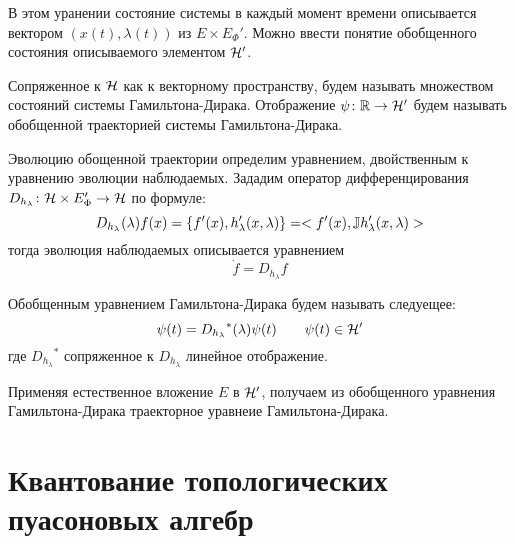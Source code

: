 \documentclass[10pt,a4paper]{article}
\begin{document}
В этом уранении состояние системы в каждый момент времени описывается вектором $(x(t),\lambda(t))$ из $E\times E_\Phi'$. Можно ввести понятие обобщенного состояния описываемого элементом $\mathcal{H}'$.

\begin{definition}
Сопряженное к $\mathcal{H}$ как к векторному пространству, будем называть множеством состояний системы Гамильтона-Дирака. Отображение $\psi\colon\mathbb{R}\to\mathcal{H}'$ будем называть обобщенной траекторией системы Гамильтона-Дирака.
\end{definition}

Эволюцию обощенной траектории определим уравнением, двойственным к уравнению эволюции наблюдаемых. Зададим оператор дифференцирования $D_{h_\lambda}\colon\mathcal{H}\times E_\Phi'\to\mathcal{H}$ по формуле:
\[D_{h_\lambda}(\lambda) f(x)=\{ {f'(x)},{h_\lambda'(x,\lambda)}\}=<{f'(x)},{\mathbb{J} h_\lambda'(x,\lambda)}>\]
тогда эволюция наблюдаемых описывается уравнением
\[\dot{f}= D_{h_\lambda} f\]

\begin{definition}
Обобщенным уравнением Гамильтона-Дирака будем называть следуещее:
\[\psi(t)={D_{h_\lambda}}^*(\lambda)\psi(t)\qquad\psi(t)\in\mathcal{H}'\]
где ${D_{h_\lambda}}^*$  сопряженное к ${D_{h_\lambda}}$ линейное отображение.
\end{definition}

Применяя естественное вложение $E$ в $\mathcal{H}'$, получаем из обобщенного уравнения Гамильтона-Дирака траекторное уравнеие Гамильтона-Дирака. 
\section{Квантование топологических пуасоновых алгебр}
\end{document}

